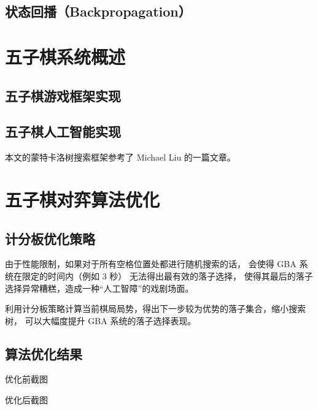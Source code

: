 \documentclass[UTF8,cs4size]{ctexart}
\begin{document}
\subsection{状态回播（Backpropagation）}
\newpage

\section{五子棋系统概述}
\subsection{五子棋游戏框架实现}
\subsection{五子棋人工智能实现}
本文的蒙特卡洛树搜索框架参考了 Michael Liu 的一篇文章\cite{web:medium_mcts}。
\newpage

\section{五子棋对弈算法优化}
\subsection{计分板优化策略}
由于性能限制，如果对于所有空格位置处都进行随机搜索的话，
会使得 GBA 系统在限定的时间内（例如 3 秒） 无法得出最有效的落子选择，
使得其最后的落子选择异常糟糕，造成一种“人工智障”的戏剧场面。

利用计分板策略计算当前棋局局势，得出下一步较为优势的落子集合，缩小搜索树，
可以大幅度提升 GBA 系统的落子选择表现。
\subsection{算法优化结果}
优化前截图

优化后截图
\newpage



\newpage
\end{document}
